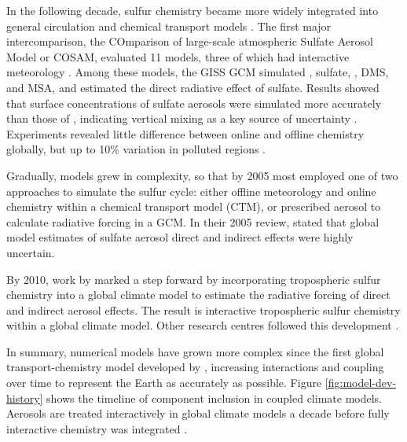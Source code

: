 In the following decade, sulfur chemistry became more widely integrated into general circulation and chemical transport models \citep[e.g.,][]{kochTroposphericSulfurSimulation1999}. The first major intercomparison, the COmparison of large-scale atmospheric Sulfate Aerosol Model or COSAM, evaluated 11 models, three of which had interactive meteorology \citep{barrieComparisonLargescaleAtmospheric2001, lohmannVerticalDistributionsSulfur2001, roelofsAnalysisRegionalBudgets2001}. Among these models, the GISS GCM simulated , sulfate, , DMS, and MSA, and estimated the direct radiative effect of sulfate. Results showed that surface concentrations of sulfate aerosols were simulated more accurately than those of , indicating vertical mixing as a key source of uncertainty \citep{lohmannVerticalDistributionsSulfur2001}. Experiments revealed little difference between online and offline chemistry globally, but up to 10\% variation in polluted regions \citep{kochTroposphericSulfurSimulation1999}.

Gradually, models grew in complexity, so that by 2005 most employed one of two approaches to simulate the sulfur cycle: either offline meteorology and online chemistry within a chemical transport model (CTM), or prescribed aerosol to calculate radiative forcing in a GCM. In their 2005 review, \citet{lohmannGlobalIndirectAerosol2005} stated that global model estimates of sulfate aerosol direct and indirect effects were highly uncertain.

By 2010, work by \citet{tsaiSulfurCycleSulfate2010} marked a step forward by incorporating tropospheric sulfur chemistry into a global climate model to estimate the radiative forcing of direct and indirect aerosol effects. The result is interactive tropospheric sulfur chemistry within a global climate model. Other research centres followed this development \citep[See ][]{lamarqueAtmosphericChemistryClimate2013}.

In summary, numerical models have grown more complex since the first global transport-chemistry model developed by \citet{langnerGlobalThreedimensionalModel1991}, increasing interactions and coupling over time to represent the Earth as accurately as possible. Figure \ref{fig:model-dev-history} shows the timeline of component inclusion in coupled climate models. Aerosols are treated interactively in global climate models a decade before fully interactive chemistry was integrated \citep{kochTroposphericSulfurSimulation1999,tsaiSulfurCycleSulfate2010}. 

